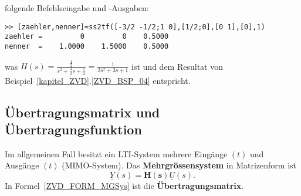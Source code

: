 folgende Befehlseingabe und \matlogo-Ausgaben:\\
\begin{small}
\begin{verbatim}
>> [zaehler,nenner]=ss2tf([-3/2 -1/2;1 0],[1/2;0],[0 1],[0],1)
zaehler =         0         0    0.5000
nenner  =    1.0000    1.5000    0.5000
\end{verbatim}
\end{small}
was  $H(s)=\frac{\frac{1}{2}}{s^2+\frac{3}{2}s+\frac{1}{2}}=\frac{1}{2s^2+3s+1}$ ist und dem Resultat von Beispiel~\ref{kapitel_ZVD}.\ref{ZVD_BSP_04} entspricht.

\subsection{\"Ubertragungsmatrix und \"Ubertragungsfunktion}
Im allgemeinen Fall besitzt ein LTI-System mehrere Eing\"ange $(t)$ und Ausg\"ange $(t)$ (MIMO-System). Das {\bf Mehrgr\"ossensystem} in Matrizenform ist \cite{UNB:81}%
\begin{equation}
\underline{Y}(s)=\boldsymbol{H(s)}\underline{U}(s).\label{ZVD_FORM_MGSys}
\end{equation}
In Formel~\ref{ZVD_FORM_MGSys} ist  die {\bf \"Ubertragungsmatrix}.

